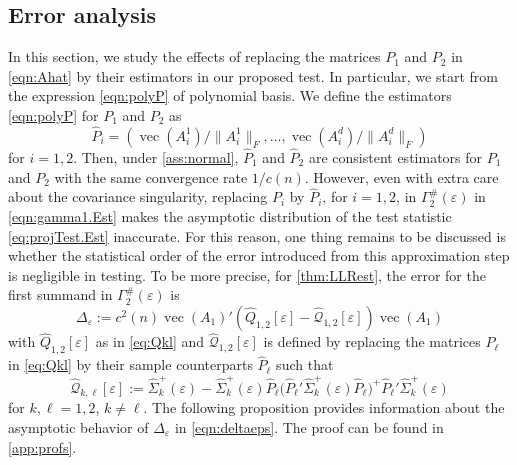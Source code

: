 \documentclass[12pt]{article}
\numberwithin{equation}{section}
\numberwithin{table}{section}
\numberwithin{thm}{section}
\numberwithin{defn}{section}
\numberwithin{lem}{section}
\numberwithin{prop}{section}
\numberwithin{cor}{section}
\numberwithin{rem}{section}
\DeclareMathOperator{\Vector}{vec}
\begin{document}
\begin{appendix}
\subsection{Error analysis}
\label{sec:error}
In this section, we study the effects of replacing the matrices $P_1$ and $P_2$ in \eqref{eqn:Ahat} by their estimators in our proposed test. In particular, we start from the expression \eqref{eqn:polyP} of polynomial basis. We define the estimators \eqref{eqn:polyP} for $P_1$ and $P_2$ as
$$
\widehat{P}_i = (\Vector(A_i^1)/\|A_i^1\|_F, \dots, \Vector(A_i^{d})/\|A_i^d\|_F)
$$
for $i = 1,2$. Then, under \autoref{ass:normal}, $\widehat{P}_1$ and $\widehat{P}_2$ are consistent estimators for $P_1$ and $P_2$ with the same convergence rate $1/c(n)$. However, even with extra care about the covariance singularity, replacing $P_i$ by $\widehat{P}_i$, for $i = 1, 2$, in $\Gamma_2^\#(\varepsilon)$ in \eqref{eqn:gamma1.Est} makes the asymptotic distribution of the test statistic \eqref{eq:projTest.Est} inaccurate. For this reason, one thing remains to be discussed is whether the statistical order of the error introduced from this approximation step is negligible in testing. To be more precise, for \autoref{thm:LLRest}, the error for the first summand in $\Gamma_2^\#(\varepsilon)$ is
\begin{equation} \label{eqn:deltaeps}
    \Delta_\varepsilon := 
    c^2(n) \Vector (A_1)' (\widehat{Q}_{1,2}[\varepsilon] - \widehat{\mathcal{Q}}_{1,2}[\varepsilon]) \Vector(A_1) 
\end{equation}
with $\widehat{Q}_{1,2}[\varepsilon]$ as in \eqref{eq:Qkl} and $\widehat{\mathcal{Q}}_{1,2}[\varepsilon]$ is defined by replacing the matrices $P_{\ell}$ in \eqref{eq:Qkl} by their sample counterparts $\widehat{P}_{\ell}$ such that
\begin{equation} \label{eqn:mathcalQ}
\widehat{\mathcal{Q}}_{k,\ell}[\varepsilon] := \widehat{\Sigma}_k^+(\varepsilon) - \widehat{\Sigma}_k^+(\varepsilon) \widehat{P}_\ell \big(\widehat{P}_\ell' \widehat{\Sigma}_k^+(\varepsilon) \widehat{P}_\ell\big)^+ \widehat{P}_\ell' \widehat{\Sigma}_k^+(\varepsilon)
\end{equation}
for $k, \ell = 1, 2$, $k \neq \ell$. The following proposition provides information about the asymptotic behavior of $\Delta_\varepsilon$ in \eqref{eqn:deltaeps}. The proof can be found in \autoref{app:profs}.


\end{appendix}
\end{document}
